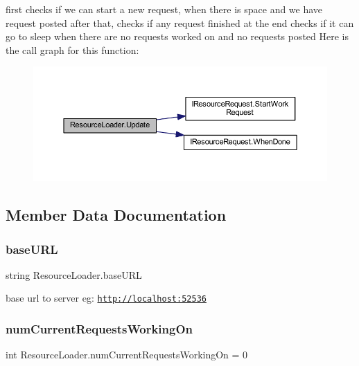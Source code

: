 first checks if we can start a new request, when there is space and we have request posted after that, checks if any request finished at the end checks if it can go to sleep when there are no requests worked on and no requests posted Here is the call graph for this function\+:
\nopagebreak
\begin{figure}[H]
\begin{center}
\leavevmode
\includegraphics[width=350pt]{class_resource_loader_a20a1036648a453863c96b51d33edfa11_cgraph}
\end{center}
\end{figure}


\subsection{Member Data Documentation}
\mbox{\label{class_resource_loader_a63594097a2099f41637445a76f8df1a9}} 
\subsubsection{\texorpdfstring{base\+U\+RL}{baseURL}}
{\footnotesize\ttfamily string Resource\+Loader.\+base\+U\+RL\hspace{0.3cm}{\ttfamily [private]}}



base url to server eg\+: \href{http://localhost:52536}{\tt http\+://localhost\+:52536} 

\mbox{\label{class_resource_loader_a3a96acf88c8727a7f76b56bbb483b706}} 
\subsubsection{\texorpdfstring{num\+Current\+Requests\+Working\+On}{numCurrentRequestsWorkingOn}}
{\footnotesize\ttfamily int Resource\+Loader.\+num\+Current\+Requests\+Working\+On = 0\hspace{0.3cm}{\ttfamily [private]}}




